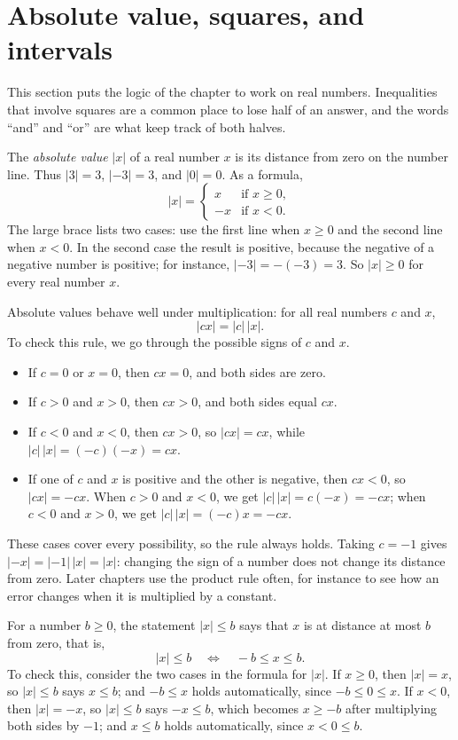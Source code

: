 \section{Absolute value, squares, and intervals}\label{sec:magnitude}
This section puts the logic of the chapter to work on real numbers. Inequalities that involve squares are a common place to lose half of an answer, and the words ``and'' and ``or'' are what keep track of both halves.

The \emph{absolute value} $|x|$ of a real number $x$ is its distance from zero on the number line. Thus $|3|=3$, $|-3|=3$, and $|0|=0$. As a formula,
\[
|x|=\begin{cases}x&\text{if }x\ge0,\\-x&\text{if }x<0.\end{cases}
\]
The large brace lists two cases: use the first line when $x\ge0$ and the second line when $x<0$. In the second case the result is positive, because the negative of a negative number is positive; for instance, $|-3|=-(-3)=3$. So $|x|\ge0$ for every real number $x$.

Absolute values behave well under multiplication: for all real numbers $c$ and $x$,
\[
|cx|=|c|\,|x|.
\]
To check this rule, we go through the possible signs of $c$ and $x$.
\begin{itemize}
\item If $c=0$ or $x=0$, then $cx=0$, and both sides are zero.
\item If $c>0$ and $x>0$, then $cx>0$, and both sides equal $cx$.
\item If $c<0$ and $x<0$, then $cx>0$, so $|cx|=cx$, while $|c|\,|x|=(-c)(-x)=cx$.
\item If one of $c$ and $x$ is positive and the other is negative, then $cx<0$, so $|cx|=-cx$. When $c>0$ and $x<0$, we get $|c|\,|x|=c(-x)=-cx$; when $c<0$ and $x>0$, we get $|c|\,|x|=(-c)x=-cx$.
\end{itemize}
These cases cover every possibility, so the rule always holds. Taking $c=-1$ gives $|-x|=|-1|\,|x|=|x|$: changing the sign of a number does not change its distance from zero. Later chapters use the product rule often, for instance to see how an error changes when it is multiplied by a constant.

For a number $b\ge0$, the statement $|x|\le b$ says that $x$ is at distance at most $b$ from zero, that is,
\[
|x|\le b\quad\Longleftrightarrow\quad -b\le x\le b.
\]
To check this, consider the two cases in the formula for $|x|$. If $x\ge0$, then $|x|=x$, so $|x|\le b$ says $x\le b$; and $-b\le x$ holds automatically, since $-b\le0\le x$. If $x<0$, then $|x|=-x$, so $|x|\le b$ says $-x\le b$, which becomes $x\ge-b$ after multiplying both sides by $-1$; and $x\le b$ holds automatically, since $x<0\le b$.

